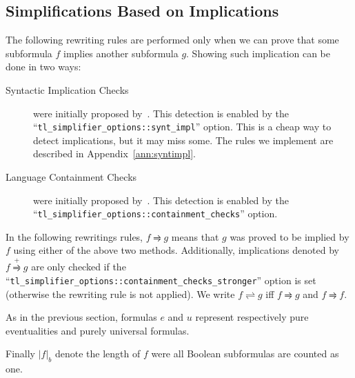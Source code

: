\documentclass[a4paper,twoside,10pt,DIV=12]{scrreprt}
\newcommand{\0}{\texttt{0}}
\newcommand{\1}{\texttt{1}}
\def\simpe{\rightleftharpoons}
\def\simp{\rightrightharpoons}
\def\Simp{\stackrel{+}{\simp}}
\begin{document}
\subsection{Simplifications Based on Implications}
\label{sec:syntimpl}

The following rewriting rules are performed only when we can prove
that some subformula $f$ implies another subformula $g$.  Showing such
implication can be done in two ways:
\begin{description}
\item[Syntactic Implication Checks] were initially proposed
  by~\citet{somenzi.00.cav}.  This detection is enabled by the
  ``\verb|tl_simplifier_options::synt_impl|'' option.  This is a
  cheap way to detect implications, but it may miss some.  The rules
  we implement are described in Appendix~\ref{ann:syntimpl}.

\item[Language Containment Checks] were initially proposed
  by~\citet{tauriainen.03.a83}.  This detection is enabled by the
  ``\verb|tl_simplifier_options::containment_checks|'' option.
\end{description}

In the following rewritings rules, $f\simp g$ means that $g$ was
proved to be implied by $f$ using either of the above two methods.
Additionally, implications denoted by $f\Simp g$ are only checked if
the ``\verb|tl_simplifier_options::containment_checks_stronger|''
option is set (otherwise the rewriting rule is not applied).  We write
$f\simpe g$ iff $f\simp g$ and $f\simp f$.

As in the previous section, formulas $e$ and $u$ represent
respectively pure eventualities and purely universal formulas.

Finally $|f|_b$ denote the length of $f$ were all Boolean subformulas
are counted as one.

\def\flessg{(f\simpe g) \land (|f|_b<|g|_b)}
\def\glessf{(f\simpe g) \land (|g|_b<|f|_b)}
\end{document}

